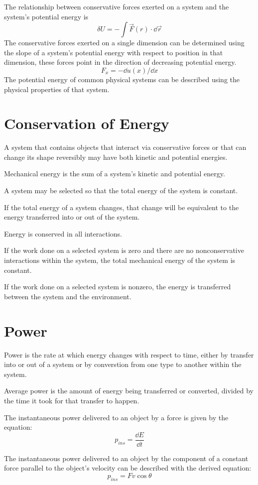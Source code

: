 \documentclass[../mech.tex]{subfiles}
\begin{document}
The relationship between conservative forces exerted on a system and the system's potential energy is 
\[ \delta U = -\int \vec{F}(r)\cdot \dd \vec{r} \]
The conservative forces exerted on a single dimension can be determined using the slope of a system's potential energy with respect to position in that dimension, these forces point in the direction of decreasing potential energy.
\[ F_x = -\dd u(x)/\dd x\]
The potential energy of common physical systems can be described using the physical properties of that system.

\section{Conservation of Energy}
A system that contains objects that interact via conservative forces or that can change its shape reversibly may have both kinetic and potential energies.

Mechanical energy is the sum of a system's kinetic and potential energy.

A system may be selected so that the total energy of the system is constant.

If the total energy of a system changes, that change will be equivalent to the energy transferred into or out of the system.

Energy is conserved in all interactions.

If the work done on a selected system is zero and there are no nonconservative interactions within the system, the total mechanical energy of the system is constant.

If the work done on a selected system is nonzero, the energy is transferred between the system and the environment.

\section{Power}
Power is the rate at which energy changes with respect to time, either by transfer into or out of a system or by converstion from one type to another within the system.

Average power is the amount of energy being transferred or converted, divided by the time it took for that transfer to happen.

The instantaneous power delivered to an object by a force is given by the equation:
\[ p_{ins}=\frac{\dd E}{\dd t} \]

The instantaneous power delivered to an object by the component of a constant force parallel to the object's velocity can be described with the derived equation:
\[ p_{ins}=Fv\cos\theta \]
\end{document}
